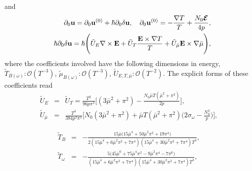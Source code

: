 \documentclass[aps,prd,showkeys,preprint,amsmath,amssymb,nofootinbib]{revtex4-1}
\begin{document}
	and
	\begin{eqnarray}\label{D0ui_full}\nonumber
	&&\partial_0{\bf u}=\partial_0{\bf u}^{(0)}+\hbar\partial_0\delta {\bf u},
	\quad
	\partial_0{\bf u}^{(0)}=-\frac{\nabla T}{T}+\frac{N_0\bm{\mathcal{E}}}{4p},
	\\
	&&\hbar\partial_0\delta {\bf u}=\hbar\Bigg(\tilde{U}_E\nabla\times{\bf E}+\tilde{U}_T\frac{{\bf E}\times\nabla T}{T}+\tilde{U}_{\bar{\mu}}{\bf E}\times\nabla\bar{\mu}\Bigg),
	\end{eqnarray}
where the coefficients involved have the following dimensions in energy, $\tilde{T}_{B(\omega)}:\mathcal{O}(T^{-3})$, $\tilde{\mu}_{B(\omega)}:\mathcal{O}(T^{-3})$, $\tilde{U}_{E,T,\bar{\mu}}:\mathcal{O}(T^{-2})$.
The explicit forms of these coefficients read
\begin{eqnarray}\nonumber 
\tilde{U}_E&=&\tilde{U}_T=\frac{T^2}{96 p\pi^2} 
\Bigg[(3 \bar{\mu}^2+\pi^2)-\frac{ N_0\bar{\mu}T(\bar{\mu}^2+ \pi ^2)}{2p}\Bigg], 
\\
\tilde{U}_{\bar{\mu}}&=&\frac{T^3}{384p^2\pi^2}\Bigg[N_0(3 \bar{\mu}^2+\pi^2)+
 \bar{\mu}T(\bar{\mu}^2+ \pi ^2)\Big(2\sigma_{\omega}-\frac{N_0^2}{p}\Big)\Bigg], \label{UE_UU}
\end{eqnarray}

\begin{eqnarray}\nonumber 
\tilde{T}_B&=&-\frac{15\bar{\mu}\Big(15 \bar{\mu}^4+50 \bar{\mu}^2 \pi ^2+19 \pi ^4\Big)}{2 \left(15 \bar{\mu}^4+6 \bar{\mu}^2 \pi ^2+7 \pi ^4\right) \left(15 \bar{\mu}^4+30 \bar{\mu}^2 \pi ^2+7 \pi ^4\right) T^3},
\\
\tilde{T}_{\omega}&=&-\frac{5\Big(45 \bar{\mu}^6+75 \bar{\mu}^4 \pi ^2-9 \bar{\mu}^2 \pi ^4-7 \pi ^6\Big)}{\left(15 \bar{\mu}^4+6 \bar{\mu}^2 \pi ^2+7 \pi ^4\right) \left(15 \bar{\mu}^4+30 \bar{\mu}^2 \pi ^2+7 \pi ^4\right) T^3}, \label{TB_TO}
\end{eqnarray}
\end{document}
